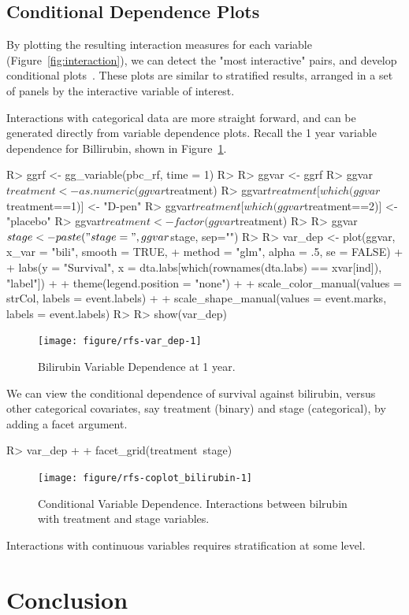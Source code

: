 \documentclass[nojss]{jss}\usepackage[]{graphicx}\usepackage[]{color}
\begin{document}
\subsection{Conditional Dependence Plots}

By plotting the resulting interaction measures for each variable (Figure~\ref{fig:interaction}), we can detect the "most interactive" pairs, and develop conditional plots~\cite{chambers:1992, cleveland:1993}. These plots are similar to stratified results, arranged in a set of panels by the interactive variable of interest. 

Interactions with categorical data are more straight forward, and can be generated directly from variable dependence plots. Recall the 1 year variable dependence for Billirubin, shown in Figure~\ref{fig:var_dep}. 
\begin{Schunk}
\begin{Sinput}
R> ggrf <- gg_variable(pbc_rf, time = 1)
R> 
R> ggvar <- ggrf
R> ggvar$treatment <- as.numeric(ggvar$treatment)
R> ggvar$treatment[which(ggvar$treatment==1)] <- "D-pen" 
R> ggvar$treatment[which(ggvar$treatment==2)] <- "placebo" 
R> ggvar$treatment <- factor(ggvar$treatment)
R> 
R> ggvar$stage <- paste("stage=", ggvar$stage, sep="")
R> 
R> var_dep <- plot(ggvar, x_var = "bili", smooth = TRUE, 
+         method = "glm", alpha = .5, se = FALSE) + 
+  labs(y = "Survival", x = dta.labs[which(rownames(dta.labs) ==  xvar[ind]), "label"]) + 
+  theme(legend.position = "none") + 
+  scale_color_manual(values = strCol, labels = event.labels) + 
+  scale_shape_manual(values = event.marks, labels = event.labels)
R> 
R> show(var_dep)
\end{Sinput}
\begin{figure}[!htpb]

{\centering \texttt{[image: figure/rfs-var\_dep-1]} 

}

\caption[Bilirubin Variable Dependence at 1 year]{Bilirubin Variable Dependence at 1 year.\label{fig:var_dep}}
\end{figure}
\end{Schunk}

We can view the conditional dependence of survival against bilirubin, versus other categorical covariates, say treatment (binary) and stage (categorical), by adding a facet argument.
\begin{Schunk}
\begin{Sinput}
R> var_dep + 
+  facet_grid(treatment~stage)
\end{Sinput}
\begin{figure}[!htpb]

{\centering \texttt{[image: figure/rfs-coplot\_bilirubin-1]} 

}

\caption[Conditional Variable Dependence]{Conditional Variable Dependence. Interactions between bilrubin with treatment and stage variables.\label{fig:coplot_bilirubin}}
\end{figure}
\end{Schunk}

Interactions with continuous variables requires stratification at some level.


\section{Conclusion}



\end{document}
